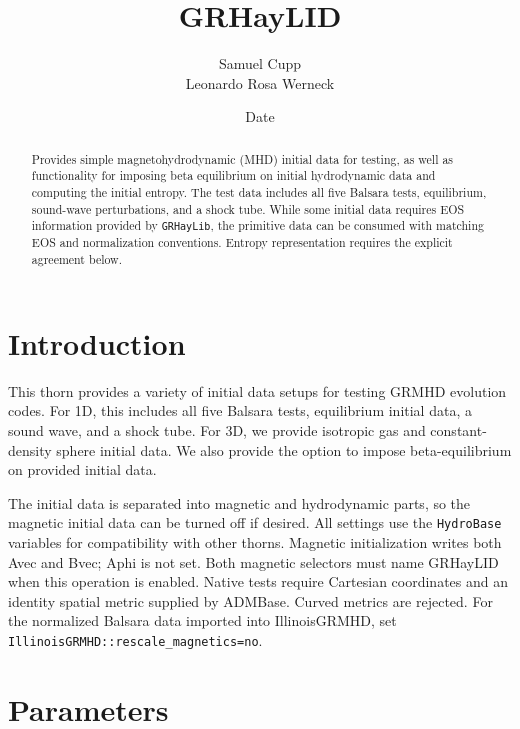 \documentclass{article}
\begin{document}
\title{GRHayLID}
\author{Samuel Cupp \\ Leonardo Rosa Werneck}
\date{$ $Date$ $}

\maketitle


\newcommand{\glib}{\texttt{GRHayLib}}
\newcommand{\gid}{\texttt{GRHayLID}}
\newcommand{\hbase}{\texttt{HydroBase}}

\begin{abstract}
Provides simple magnetohydrodynamic (MHD) initial data for testing,
as well as functionality for imposing beta equilibrium on initial
hydrodynamic data and computing the initial entropy. The test data
includes all five Balsara tests, equilibrium, sound-wave perturbations,
and a shock tube. While
some initial data requires EOS information provided by \glib,
the primitive data can be consumed with matching EOS and normalization
conventions. Entropy representation requires the explicit agreement below.
\end{abstract}

\section{Introduction}

This thorn provides a variety of initial data setups for
testing GRMHD evolution codes. For 1D, this includes all five
Balsara tests, equilibrium initial data, a sound wave, and
a shock tube. For 3D, we provide isotropic gas and
constant-density sphere initial data. We also provide the option
to impose beta-equilibrium on provided initial data.

The initial data is separated into magnetic and hydrodynamic
parts, so the magnetic initial data can be turned off if desired.
All settings use the \hbase{} variables for compatibility with
other thorns. Magnetic initialization writes both Avec and Bvec; Aphi is
not set. Both magnetic selectors must name GRHayLID when this operation is
enabled. Native tests require Cartesian coordinates and an identity spatial
metric supplied by ADMBase. Curved metrics are rejected. For the normalized
Balsara data imported into IllinoisGRMHD, set
\texttt{IllinoisGRMHD::rescale\_magnetics=no}.

\section{Parameters}
\end{document}
